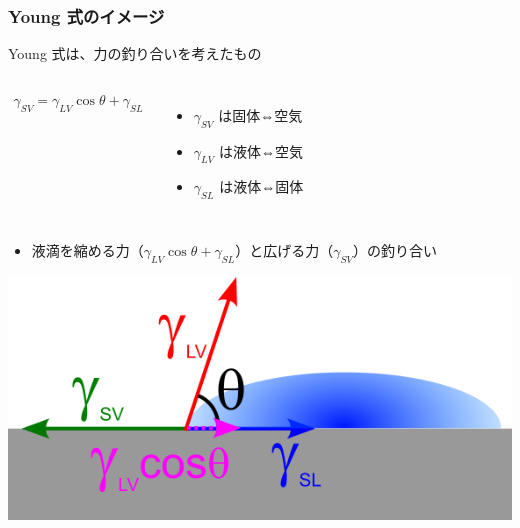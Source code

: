 \documentclass[12pt, dvipdfmx]{beamer}
\begin{document}
\begin{frame}
	\frametitle{Young 式のイメージ}
	\begin{block}{Young 式は、力の釣り合いを考えたもの}
		\begin{columns}[c, onlytextwidth]
			\begin{align*}
				\gamma_{SV} = \gamma_{LV} \cos \theta + \gamma_{SL}
			\end{align*}
			\begin{itemize}
				\item $\gamma_{SV}$ は固体⇔空気
				\item $\gamma_{LV}$ は液体⇔空気
				\item $\gamma_{SL}$ は液体⇔固体
			\end{itemize}
		\end{columns}
		
		\vspace{2mm}
		\begin{itemize}
			\item 液滴を縮める力（$\gamma_{LV} \cos \theta + \gamma_{SL}$）と広げる力（$\gamma_{SV}$）の釣り合い
		\end{itemize}

		\centering
			\includegraphics[width=.45\textwidth]{young.png}
	\end{block}
\end{frame}
\end{document}
